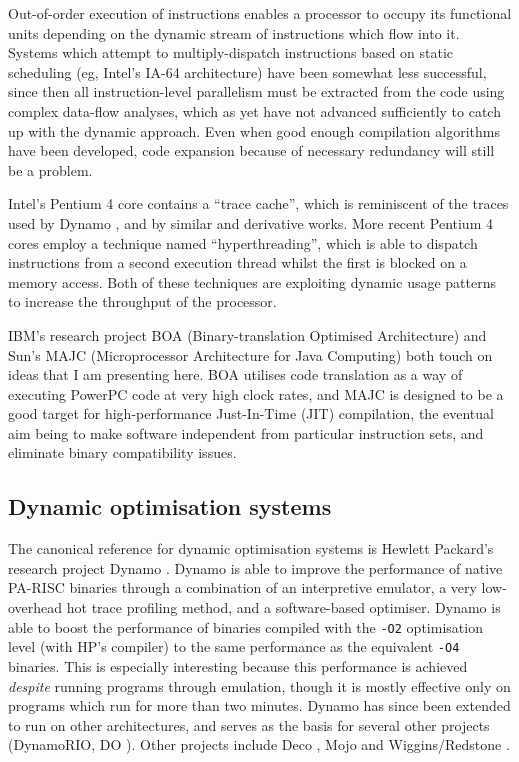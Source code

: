 \documentclass[11pt,letterpaper,onecolumn,notitlepage]{article}
\begin{document}
Out-of-order execution of instructions enables a processor to occupy its functional units depending on the dynamic stream of instructions which flow into it. Systems which attempt to multiply-dispatch instructions based on static scheduling (eg, Intel's IA-64 architecture) have been somewhat less successful, since then all instruction-level parallelism must be extracted from the code using complex data-flow analyses, which as yet have not advanced sufficiently to catch up with the dynamic approach. Even when good enough compilation algorithms have been developed, code expansion because of necessary redundancy will still be a problem.

Intel's Pentium 4 core contains a ``trace cache'', which is reminiscent of the traces used by Dynamo \cite{Dynamo}, and by similar and derivative works. More recent Pentium 4 cores employ a technique named ``hyperthreading'', which is able to dispatch instructions from a second execution thread whilst the first is blocked on a memory access. Both of these techniques are exploiting dynamic usage patterns to increase the throughput of the processor.

IBM's research project BOA (Binary-translation Optimised Architecture) and Sun's MAJC (Microprocessor Architecture for Java Computing) both touch on ideas that I am presenting here. BOA utilises code translation as a way of executing PowerPC code at very high clock rates, and MAJC is designed to be a good target for high-performance Just-In-Time (JIT) compilation, the eventual aim being to make software independent from particular instruction sets, and eliminate binary compatibility issues.

\subsection{Dynamic optimisation systems}

The canonical reference for dynamic optimisation systems is Hewlett Packard's research project Dynamo \cite{Dynamo}. Dynamo is able to improve the performance of native PA-RISC binaries through a combination of an interpretive emulator, a very low-overhead hot trace profiling method, and a software-based optimiser. Dynamo is able to boost the performance of binaries compiled with the {\tt -O2} optimisation level (with HP's compiler) to the same performance as the equivalent {\tt -O4} binaries. This is especially interesting because this performance is achieved {\em despite} running programs through emulation, though it is mostly effective only on programs which run for more than two minutes. Dynamo has since been extended to run on other architectures, and serves as the basis for several other projects (DynamoRIO, DO \cite{KimHazelwood}). Other projects include Deco \cite{Deco}, Mojo \cite{Mojo} and Wiggins/Redstone \cite{WigginsRedstone}.
\end{document}
